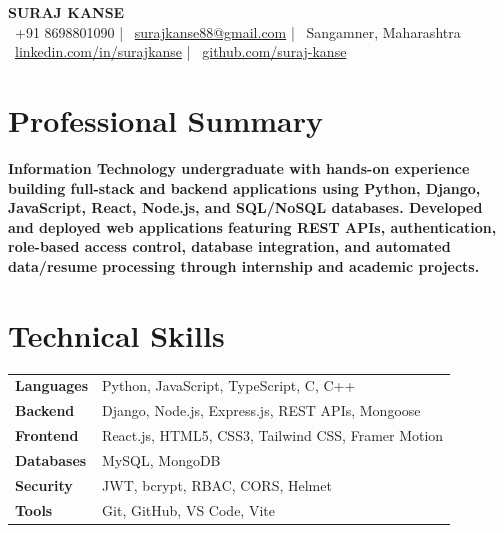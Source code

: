 \documentclass[a4paper,10pt]{article}
\begin{document}

\begin{center}
    {\Huge \textbf{SURAJ KANSE}}\\[6pt]

    \faPhone\ +91 8698801090 \quad | \quad
    \faEnvelope\ \href{mailto:surajkanse88@gmail.com}{surajkanse88@gmail.com} \quad | \quad
    \faMapMarker*\ Sangamner, Maharashtra \\
    \faLinkedin\ \href{https://linkedin.com/in/surajkanse}{linkedin.com/in/surajkanse}
    \quad | \quad
    \faGithub\ \href{https://github.com/suraj-kanse}{github.com/suraj-kanse}
\end{center}


\vspace{-13pt}

\section*{Professional Summary}
\textbf{Information Technology undergraduate with hands-on experience building full-stack and backend applications using Python, Django, JavaScript, React, Node.js, and SQL/NoSQL databases. Developed and deployed web applications featuring REST APIs, authentication, role-based access control, database integration, and automated data/resume processing through internship and academic projects.}


\section*{Technical Skills}

\begin{tabularx}{\textwidth}{>{\bfseries}l X}
Languages & Python, JavaScript, TypeScript, C, C++ \\ 
Backend & Django, Node.js, Express.js, REST APIs, Mongoose \\ 
Frontend & React.js, HTML5, CSS3, Tailwind CSS, Framer Motion\\ 
Databases & MySQL, MongoDB \\
Security & JWT, bcrypt, RBAC, CORS, Helmet \\
Tools & Git, GitHub, VS Code, Vite \\
\end{tabularx}
\end{document}
